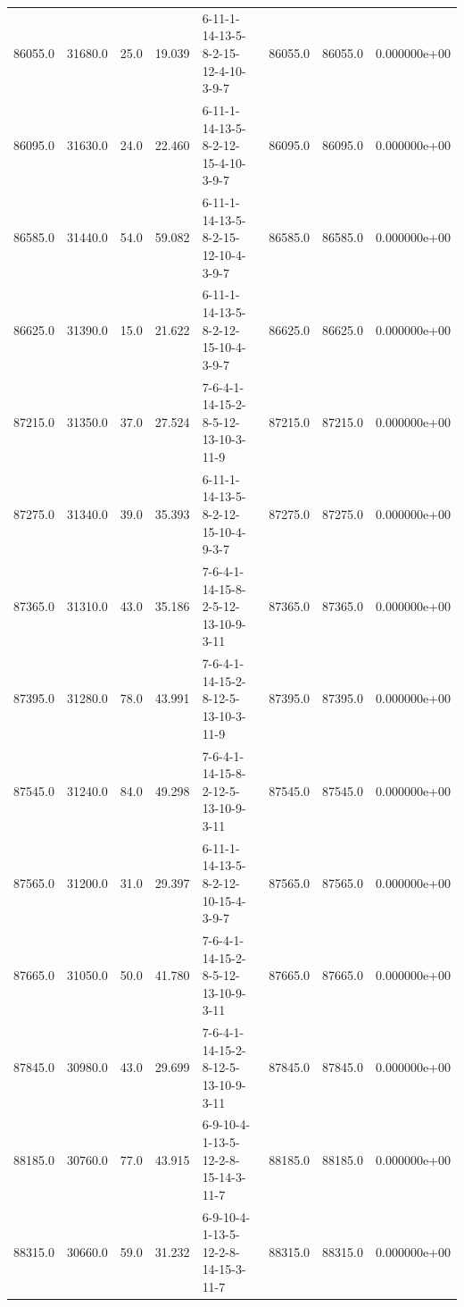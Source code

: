 \begin{tabular}{rrrrlrrr}
  86055.0 &  31680.0 &           25.0 &             19.039 &  6-11-1-14-13-5-8-2-15-12-4-10-3-9-7 &       86055.0 &         86055.0 &  0.000000e+00 \\
  86095.0 &  31630.0 &           24.0 &             22.460 &  6-11-1-14-13-5-8-2-12-15-4-10-3-9-7 &       86095.0 &         86095.0 &  0.000000e+00 \\
  86585.0 &  31440.0 &           54.0 &             59.082 &  6-11-1-14-13-5-8-2-15-12-10-4-3-9-7 &       86585.0 &         86585.0 &  0.000000e+00 \\
  86625.0 &  31390.0 &           15.0 &             21.622 &  6-11-1-14-13-5-8-2-12-15-10-4-3-9-7 &       86625.0 &         86625.0 &  0.000000e+00 \\
  87215.0 &  31350.0 &           37.0 &             27.524 &  7-6-4-1-14-15-2-8-5-12-13-10-3-11-9 &       87215.0 &         87215.0 &  0.000000e+00 \\
  87275.0 &  31340.0 &           39.0 &             35.393 &  6-11-1-14-13-5-8-2-12-15-10-4-9-3-7 &       87275.0 &         87275.0 &  0.000000e+00 \\
  87365.0 &  31310.0 &           43.0 &             35.186 &  7-6-4-1-14-15-8-2-5-12-13-10-9-3-11 &       87365.0 &         87365.0 &  0.000000e+00 \\
  87395.0 &  31280.0 &           78.0 &             43.991 &  7-6-4-1-14-15-2-8-12-5-13-10-3-11-9 &       87395.0 &         87395.0 &  0.000000e+00 \\
  87545.0 &  31240.0 &           84.0 &             49.298 &  7-6-4-1-14-15-8-2-12-5-13-10-9-3-11 &       87545.0 &         87545.0 &  0.000000e+00 \\
  87565.0 &  31200.0 &           31.0 &             29.397 &  6-11-1-14-13-5-8-2-12-10-15-4-3-9-7 &       87565.0 &         87565.0 &  0.000000e+00 \\
  87665.0 &  31050.0 &           50.0 &             41.780 &  7-6-4-1-14-15-2-8-5-12-13-10-9-3-11 &       87665.0 &         87665.0 &  0.000000e+00 \\
  87845.0 &  30980.0 &           43.0 &             29.699 &  7-6-4-1-14-15-2-8-12-5-13-10-9-3-11 &       87845.0 &         87845.0 &  0.000000e+00 \\
  88185.0 &  30760.0 &           77.0 &             43.915 &  6-9-10-4-1-13-5-12-2-8-15-14-3-11-7 &       88185.0 &         88185.0 &  0.000000e+00 \\
  88315.0 &  30660.0 &           59.0 &             31.232 &  6-9-10-4-1-13-5-12-2-8-14-15-3-11-7 &       88315.0 &         88315.0 &  0.000000e+00 \\

\end{tabular}
